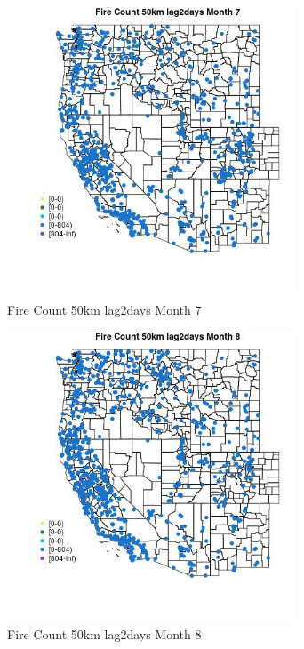 \begin{figure} 
\centering  
\includegraphics[width=0.77\textwidth]{Code_Outputs/Report_ML_input_PM25_Step4_part_f_de_duplicated_aves_prioritize_24hr_obswNAs_MapObsMo7Fire_Count_50km_lag2days.jpg} 
\caption{\label{fig:Report_ML_input_PM25_Step4_part_f_de_duplicated_aves_prioritize_24hr_obswNAsMapObsMo7Fire_Count_50km_lag2days}Fire Count 50km lag2days Month 7} 
\end{figure} 
 

\begin{figure} 
\centering  
\includegraphics[width=0.77\textwidth]{Code_Outputs/Report_ML_input_PM25_Step4_part_f_de_duplicated_aves_prioritize_24hr_obswNAs_MapObsMo8Fire_Count_50km_lag2days.jpg} 
\caption{\label{fig:Report_ML_input_PM25_Step4_part_f_de_duplicated_aves_prioritize_24hr_obswNAsMapObsMo8Fire_Count_50km_lag2days}Fire Count 50km lag2days Month 8} 
\end{figure} 
 

